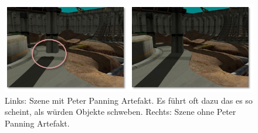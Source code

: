 \begin{figure}[H]
	\begin{center}
    \includegraphics[width=1\textwidth]{res/img/peter-panning1/image.jpg}
    \caption{Links\hspace{6}: Szene mit Peter Panning Artefakt. Es führt oft dazu das es so scheint, als würden Objekte schweben.
        \newline Rechts: Szene ohne Peter Panning Artefakt.}
	\end{center}
	\label{fig:peter-panning}
\end{figure}


